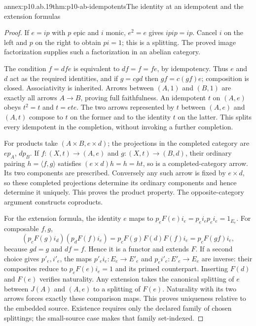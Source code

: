 \begin{annexitem}{annex:p10.ab.19}{thm:p10-ab-idempotents}{The identity at an idempotent and the extension formulas}
\begin{proof}
If \(e=ip\) with \(p\) epic and \(i\) monic, \(e^2=e\)
gives \(ipip=ip\). Cancel \(i\) on the left and \(p\) on the
right to obtain \(pi=1\); this is a splitting. The proved image
factorization supplies such a factorization in an abelian category.

The condition \(f=dfe\) is equivalent to \(df=f=fe\), by
idempotency. Thus \(e\) and \(d\) act as the required identities,
and if \(g=cgd\) then \(gf=c(gf)e\); composition is closed.
Associativity is inherited. Arrows between \((A,1)\) and \((B,1)\)
are exactly all arrows \(A\to B\), proving full faithfulness.
An idempotent \(t\) on \((A,e)\) obeys \(t^2=t\) and
\(t=ete\). The two arrows represented by \(t\) between
\((A,e)\) and \((A,t)\) compose to \(t\) on the former and
to the identity \(t\) on the latter. This splits every idempotent
in the completion, without invoking a further completion.

For products take \((A\times B,e\times d)\); the projections
in the completed category are \(e p_A\), \(d p_B\).
If \(f:(X,t)\to(A,e)\) and \(g:(X,t)\to(B,d)\), their
ordinary pairing \(h=\langle f,g\rangle\) satisfies
\((e\times d)h=h=ht\), so is a completed-category arrow.
Its two components are prescribed. Conversely any such arrow is fixed
by \(e\times d\), so these completed projections determine its
ordinary components and hence determine it uniquely. This proves the
product property. The opposite-category argument constructs coproducts.

For the extension formula, the identity \(e\) maps to
\(p_eF(e)i_e=p_ei_ep_ei_e=1_{E_e}\). For composable \(f,g\),
\[
 (p_cF(g)i_d)(p_dF(f)i_e)
 =p_cF(g)F(d)F(f)i_e=p_cF(gf)i_e,
\]
because \(gd=g\) and \(df=f\). Hence it is a functor and
extends \(F\). If a second choice gives \(p'_e,i'_e\), the maps
\(p'_e i_e:E_e\to E'_e\) and \(p_e i'_e:E'_e\to E_e\)
are inverse: their composites reduce to \(p_eF(e)i_e=1\) and
its primed counterpart. Inserting \(F(d)\) and \(F(e)\) verifies
naturality. Any extension takes the canonical splitting of \(e\)
between \(J(A)\) and \((A,e)\) to a splitting of \(F(e)\).
Naturality with its two arrows forces exactly these comparison maps.
This proves uniqueness relative to the embedded source. Existence
requires only the declared family of chosen splittings; the small-source
case makes that family set-indexed.
\end{proof}
\end{annexitem}

